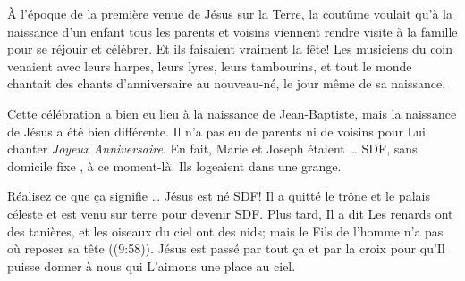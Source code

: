 


À l'époque de la première venue de Jésus sur la Terre, la coutûme voulait qu'à la naissance d'un enfant tous les parents et voisins viennent rendre visite à la famille pour se réjouir et célébrer. Et ils faisaient vraiment la fête! Les musiciens du coin venaient avec leurs harpes, leurs lyres, leurs tambourins, et tout le monde chantait des chants d'anniversaire au nouveau-né, le jour même de sa naissance.

Cette célébration a bien eu lieu à la naissance de Jean-Baptiste, mais la naissance de Jésus a été bien différente. Il n'a pas eu de parents ni de voisins pour Lui chanter \emph{Joyeux Anniversaire}. En fait, Marie et Joseph étaient … SDF, \og sans domicile fixe \fg{}, à ce moment-là. Ils logeaient dans une grange.

Réalisez ce que ça signifie … Jésus est né SDF! Il a quitté le trône et le palais céleste et est venu sur terre pour devenir SDF. Plus tard, Il a dit\frcolon{} \og Les renards ont des tanières, et les oiseaux du ciel ont des nids; mais le Fils de l’homme n’a pas où reposer sa tête \fg{} ((9:58)). Jésus est passé par tout ça \ocadr et par la croix \fcadr{} pour qu'Il puisse donner à nous qui L'aimons une place au ciel.


